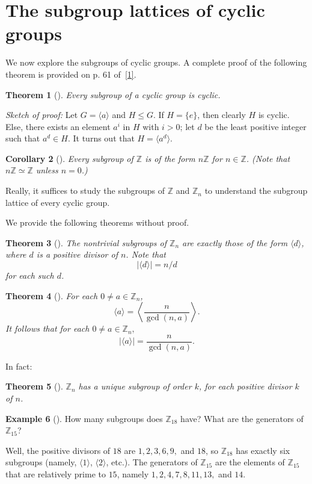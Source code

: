 \documentclass[10pt,]{book}
\theoremstyle{plain}
\newtheorem{theorem}{Theorem}[section]
\newtheorem{corollary}[theorem]{Corollary}
\theoremstyle{definition}
\theoremstyle{definition}
\theoremstyle{definition}
\newtheorem{example}[theorem]{Example}
\theoremstyle{definition}
\numberwithin{equation}{section}
\def\Z{\mathbb{Z}}
\begin{document}
\section[{The subgroup lattices of cyclic groups}]{The subgroup lattices of cyclic groups}\label{section-16}
We now explore the subgroups of cyclic groups. A complete proof of the following theorem is provided on p. 61 of~\hyperlink{F}{[1]}.%
\begin{theorem}[{}]\label{subc}
Every subgroup of a cyclic group is cyclic.%
\end{theorem}
\emph{Sketch of proof:} Let \(G=\langle a\rangle\) and \(H\leq G\). If \(H=\{e\}\), then clearly \(H\) is cyclic. Else, there exists an element \(a^i\) in \(H\) with \(i>0\); let \(d\) be the least positive integer such that \(a^d\in H\). It turns out that \(H=\langle a^d\rangle\).%
\begin{corollary}[{}]\label{corollary-5}
Every subgroup of \(\Z\) is of the form \(n\Z\) for \(n\in \Z\). (Note that \(n\Z\simeq \Z\) unless \(n=0\).)%
\end{corollary}
Really, it suffices to study the subgroups of \(\Z\) and \(\Z_n\) to understand the subgroup lattice of every cyclic group.%
\par
We provide the following theorems without proof.%
\begin{theorem}[{}]\label{znsubgps}
The nontrivial subgroups of \(\Z_n\) are exactly those of the form \(\langle d\rangle\), where \(d\) is a positive divisor of \(n\). Note that%
\begin{equation*}
|\langle d\rangle |=n/d
\end{equation*}
for each such \(d\).%
\end{theorem}
\begin{theorem}[{}]\label{theorem-30}
For each \(0\neq a\in \Z_n\),%
\begin{equation*}
\langle a\rangle =\left\langle \frac{n}{\gcd(n,a)}\right\rangle.
\end{equation*}
It follows that for each \(0\neq a \in \Z_n,\)%
\begin{equation*}
|\langle a\rangle |=\frac{n}{\gcd(n,a)}.
\end{equation*}
%
\end{theorem}
In fact:%
\begin{theorem}[{}]\label{theorem-31}
\(\Z_n\) has a unique subgroup of order \(k\), for each positive divisor \(k\) of \(n\).%
\end{theorem}
\begin{example}[]\label{example-46}
How many subgroups does \(\Z_{18}\) have? What are the generators of \(\Z_{15}\)?%
\par
Well, the positive divisors of \(18\) are \(1,2,3,6,9,\) and \(18\), so \(\Z_{18}\) has exactly six subgroups (namely, \(\langle 1\rangle\), \(\langle 2\rangle\), etc.). The generators of \(\Z_{15}\) are the elements of \(\Z_{15}\) that are relatively prime to \(15\), namely \(1,2,4,7,8,11,13,\) and \(14\).%
\end{example}
\end{document}
